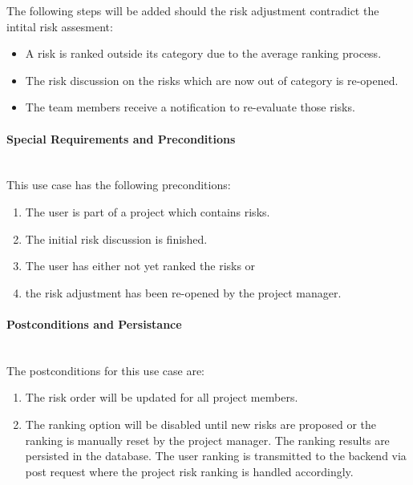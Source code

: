 	The following steps will be added should the risk adjustment contradict the intital risk assesment:
\begin{itemize}
	\vspace{-3mm}
	\setlength\itemsep{-1em}
	\item A risk is ranked outside its category due to the average ranking process.
	\item The risk discussion on the risks which are now out of category is re-opened.
	\item The team members receive a notification to re-evaluate those risks.
\end{itemize}


\paragraph*{Special Requirements and Preconditions}\mbox{}\\
This use case has the following preconditions:
\begin{enumerate}
	\vspace{-3mm}
	\setlength\itemsep{-1em}
	\item The user is part of a project which contains risks.
	\item The initial risk discussion is finished.
	\item The user has either not yet ranked the risks or 
	\item the risk adjustment has been re-opened by the project manager.
\end{enumerate}

\paragraph*{Postconditions and Persistance}\mbox{}\\
The postconditions for this use case are:
\begin{enumerate}
	\vspace{-3mm}
	\setlength\itemsep{-1em}
	\item The risk order will be updated for all project members.
	\item The ranking option will be disabled until new risks are proposed or the ranking is manually reset by the project manager.
\noindent	
The ranking results are persisted in the database. The user ranking is transmitted to the backend via post request where the project risk ranking is handled accordingly.
\end{enumerate}


